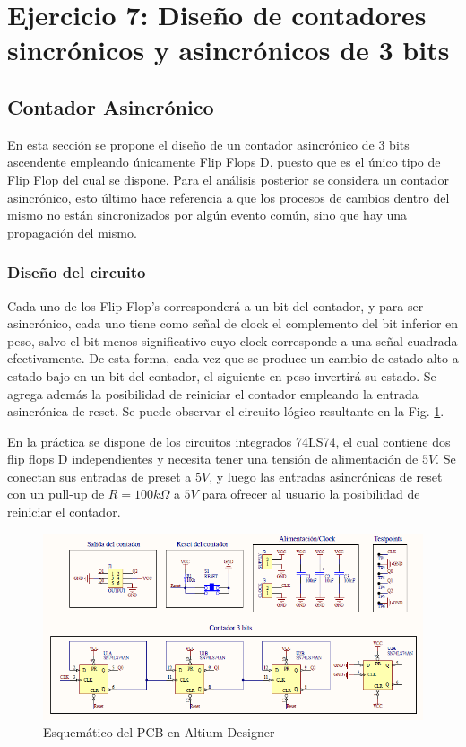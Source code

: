\section{Ejercicio 7: Dise\~no de contadores sincr\'onicos y asincr\'onicos de 3 bits}

\subsection{Contador Asincr\'onico}
En esta secci\'on se propone el dise\~no de un contador asincr\'onico de 3 bits ascendente empleando \'unicamente Flip Flops D, puesto que es el \'unico tipo de Flip Flop del cual se dispone.
Para el an\'alisis posterior se considera un contador asincr\'onico, esto \'ultimo hace referencia a que los procesos de cambios dentro del mismo no est\'an sincronizados por alg\'un evento com\'un,
sino que hay una propagaci\'on del mismo.

\subsubsection{Dise\~no del circuito}
Cada uno de los Flip Flop's corresponder\'a a un bit del contador, y para ser asincr\'onico, cada uno tiene como se\~nal de clock el complemento del bit inferior en peso, salvo el bit menos significativo cuyo clock
corresponde a una se\~nal cuadrada efectivamente. De esta forma, cada vez que se produce un cambio de estado alto a estado bajo en un bit del contador, el siguiente en peso invertir\'a su estado.
Se agrega adem\'as la posibilidad de reiniciar el contador empleando la entrada asincr\'onica de reset. Se puede observar el circuito l\'ogico resultante en la Fig. \ref{fig:esquematico_asincronico}.

En la pr\'actica se dispone de los circuitos integrados 74LS74, el cual contiene dos flip flops D independientes y necesita tener una tensi\'on de alimentaci\'on de $5V$.
Se conectan sus entradas de preset a $5V$, y luego las entradas asincr\'onicas de reset con un pull-up de $R = 100k\Omega$ a $5V$ para ofrecer al usuario la posibilidad de reiniciar el contador.

\begin{figure}[H]
    \centering
        \includegraphics[scale=0.7]{../EJ7/Recursos/esquematico_asincronico.PNG}
    \caption{Esquem\'atico del PCB en Altium Designer}
    \label{fig:esquematico_asincronico}
\end{figure}

